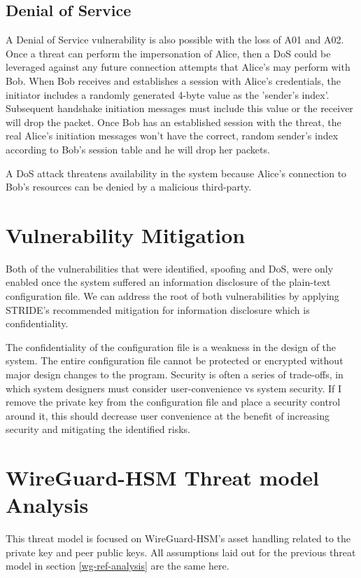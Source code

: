 \documentclass [11pt, proquest] {uwthesis}[2020/02/24]
\begin{document}
\subsection{Denial of Service}
\label{dos}
A Denial of Service vulnerability is also possible with the loss of A01 and A02. Once a threat can perform the impersonation of Alice, then a DoS could be leveraged against any future connection attempts that Alice's may perform with Bob. When Bob receives and establishes a session with Alice's credentials, the initiator includes a randomly generated 4-byte value as the 'sender's index'. Subsequent handshake initiation messages must include this value or the receiver will drop the packet. Once Bob has an established session with the threat, the real Alice's initiation messages won't have the correct, random sender's index according to Bob's session table and he will drop her packets.

A DoS attack threatens availability in the system because Alice's connection to Bob's resources can be denied by a malicious third-party.

\section{Vulnerability Mitigation}
Both of the vulnerabilities that were identified, spoofing and DoS, were only enabled once the system suffered an information disclosure of the plain-text configuration file. We can address the root of both vulnerabilities by applying STRIDE's recommended mitigation for information disclosure which is confidentiality. 

The confidentiality of the configuration file is a weakness in the design of the system. The entire configuration file cannot be protected or encrypted without major design changes to the program.
Security is often a series of trade-offs, in which system designers must consider user-convenience vs system security. If I remove the private key from the configuration file and place a security control around it, this should decrease user convenience at the benefit of increasing security and mitigating the identified risks.

\section{WireGuard-HSM Threat model Analysis}
\label{wg-hsm-analysis}
This threat model is focused on WireGuard-HSM's asset handling related to the private key and peer public keys. All assumptions laid out for the previous threat model in section \ref{wg-ref-analysis} are the same here.
\end{document}
